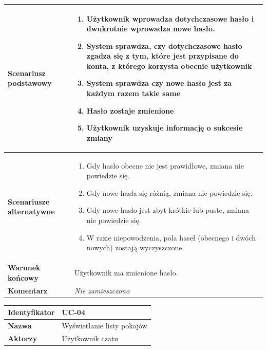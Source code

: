 \documentclass[11pt,oneside,a4paper,titlepage,onecolumn]{article}
\newenvironment{enumreq}
{ \begin{enumerate}[topsep=0pt,itemsep=-1ex,partopsep=1ex,parsep=1ex] }
{ \end{enumerate}                  }
\begin{document}
{\begin{tabular}{ | l | l | }
	\hline
		\parbox[t]{4cm}{\textbf{Scenariusz podstawowy}} & \parbox[t]{11cm}{
			\begin{enumreq}
				\item Użytkownik wprowadza dotychczasowe hasło i dwukrotnie
				wprowadza nowe hasło.
				\item System sprawdza, czy dotychczasowe hasło zgadza się
				z tym, które jest przypisane do konta, z którego korzysta
				obecnie użytkownik
				\item System sprawdza czy nowe hasło jest za każdym razem
				takie same
				\item Hasło zostaje zmienione
				\item Użytkownik uzyskuje informację o sukcesie zmiany
			\end{enumreq}
		}
		\\
		
	\hline
		\parbox[t]{4cm}{\textbf{Scenariusze alternatywne}} & \parbox[t]
		{11cm}{
			\begin{enumreq}
				\item Gdy hasło obecne nie jest prawidłowe, zmiana nie
				powiedzie się.
				\item Gdy nowe hasła się różnią, zmiana nie powiedzie się.
				\item Gdy nowe hasło jest zbyt krótkie lub puste, zmiana
				nie powiedzie się.
				\item W razie niepowodzenia, pola haseł (obecnego i dwóch
				nowych) zostają wyczyszczone.
			\end{enumreq}
		}
		\\
		
	\hline
		\parbox[t]{4cm}{\textbf{Warunek końcowy}} & \parbox[t]{11cm}{
			Użytkownik ma zmienione hasło.
		}
		\\
		
	\hline
		\parbox[t]{4cm}{\textbf{Komentarz}} & \parbox[t]{11cm}{
			\textit{Nie zamieszczono}
		}
		\\

	\hline
\end{tabular}

\vspace{2em}

\begin{tabular}{ | l | l | }
	\hline
		\textbf{Identyfikator} & 
		UC-04
		\\
		
	\hline
		\textbf{Nazwa} & 
		Wyświetlanie listy pokojów
		\\
		
	\hline
		\textbf{Aktorzy} & \parbox[t]{11cm}{
			Użytkownik czatu
		}\\
		 

\end{tabular}}
\end{document}
